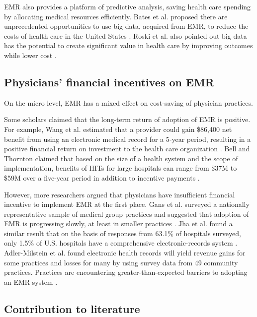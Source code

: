 
EMR also provides a platform of predictive analysis, saving health care spending by allocating medical resources efficiently. Bates et al. proposed there are unprecedented opportunities to use big data, acquired from EMR, to reduce the costs of health care in the United States \citep{Bates2014}. Roski et al. also pointed out big data has the potential to create significant value in health care by improving outcomes while lower cost \citep{Roski2014}.

\subsection{Physicians' financial incentives on EMR}
On the micro level, EMR has a mixed effect on cost-saving of physician practices.

Some scholars claimed that the long-term return of adoption of EMR is positive. For example, Wang et al. estimated that a provider could gain \$86,400 net benefit from using an electronic medical record for a 5-year period, resulting in a positive financial return on investment to the health care organization \citep{Wang2003}. Bell and Thornton claimed that based on the size of a health system and the scope of implementation, benefits of HITs for large hospitals can range from \$37M to \$59M over a five-year period in addition to incentive payments \citep{Bell2011}.

However, more researchers argued that physicians have insufficient financial incentive to implement EMR at the first place. Gans et al. surveyed a nationally representative sample of medical group practices and suggested that adoption of EMR is progressing slowly, at least in smaller practices \citep{Gans2005}. Jha et al. found a similar result that on the basis of responses from 63.1\% of hospitals surveyed, only 1.5\% of U.S. hospitals have a comprehensive electronic-records system \citep{Jha2009}. Adler-Milstein et al. found electronic health records will yield revenue gains for some practices and losses for many by using survey data from 49 community practices. Practices are encountering greater-than-expected barriers to adopting an EMR system \citep{Adler-Milstein2012}.

\subsection{Contribution to literature}

